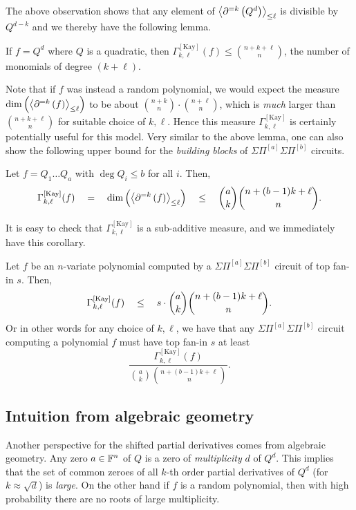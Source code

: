 \documentclass[12pt]{report}
\newcommand{\CM}[1]{\Gamma^{\mathrm{[#1]}}}
\newcommand{\SPD}[3]{\inangle{\partial^{=#1}\inparen{#3}}_{\leq #2}}
\newcommand{\mySPSP}[2]{\Sigma\Pi^{[#1]}\Sigma\Pi^{[#2]}}
\begin{document}
The above observation shows that any element of $\SPD{k}{\ell}{Q^d}$ is divisible by $Q^{d-k}$ and we thereby have the following lemma. 

\begin{lemma}
  If $f = Q^d$ where $Q$ is a quadratic, then $\CM{Kay}_{k,\ell}(f)\leq \binom{n + k + \ell}{n}$, the number of monomials of degree $(k + \ell)$. 
\end{lemma}

Note that if $f$ was instead a random polynomial, we would expect the measure  $\dim \inparen{\SPD{k}{\ell}{f}}$ to be about $\binom{n+k}{n} \cdot \binom{n+\ell}{n}$, which is \emph{much} larger than $\binom{n+k+\ell}{n}$ for suitable choice of $k,\ell$. Hence this measure $\CM{Kay}_{k,\ell}$ is certainly potentially useful for this model. Very similar to the above lemma, one can also show the following upper bound for the \emph{building blocks} of $\mySPSP{a}{b}$ circuits. 

\begin{lemma}
Let $f = Q_1\dots Q_a$ with $\deg Q_i \leq b$ for all $i$. Then, 
$$
\CM{Kay}_{k,\ell}(f) \spaced{=} \dim \inparen{\SPD{k}{\ell}{f}} \spaced{\leq} \binom{a}{k}\binom{n + (b-1)k + \ell}{n}.
$$
\end{lemma}

It is easy to check that $\CM{Kay}_{k,\ell}$ is a sub-additive measure, and we immediately have this corollary. 

\begin{corollary}\label{cor:dimSPD-upper-bound}
Let $f$ be an $n$-variate polynomial computed by a $\mySPSP{a}{b}$ circuit of top fan-in $s$. Then,
$$
\CM{Kay}_{k,\ell}(f) \spaced{\leq} s\cdot \binom{a}{k}\binom{n + (b-1)k + \ell}{n}.
$$
Or in other words for any choice of $k,\ell$, we have that any $\mySPSP{a}{b}$ circuit computing a polynomial $f$ must have top fan-in $s$ at least
$$\frac{\CM{Kay}_{k,\ell}(f)}{\binom{a}{k}\binom{n+(b-1)k + \ell}{n}}.$$ 
\end{corollary}



\subsection*{Intuition from algebraic geometry}

Another perspective for the shifted partial derivatives comes from algebraic geometry. Any zero $a\in \mathbb{F}^n$ of $Q$ is a zero of \emph{multiplicity} $d$ of $Q^d$. This implies that the set of common zeroes of all $k$-th order partial derivatives of $Q^d$ (for $k \approx  \sqrt{d}$) is \emph{large}. On the other hand if $f$ is a random polynomial, then with high probability there are no roots of large multiplicity. 
\end{document}
